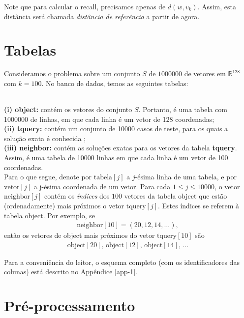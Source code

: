 \documentclass[a4paper,12pt,titlepage]{scrartcl}
\begin{document}
Note que para calcular o recall, precisamos apenas de $d(w,v_k)$. Assim, esta distância será chamada \emph{distância de referência} a partir de agora. 

\section{Tabelas}

Consideramos o problema sobre um conjunto $S$ de $1000000$ de vetores em $\mathbb{R}^{128}$ com $k = 100$. No banco de dados, temos as seguintes tabelas:\\\

\noindent\textbf{(i) object:} contém os vetores do conjunto $S$. Portanto, é uma tabela com 1000000 de linhas, em que cada linha é um vetor de 128 coordenadas;\\

\noindent\textbf{(ii) tquery:} contém um conjunto de 10000 casos de teste, para os quais a solução exata é conhecida ; \\

\noindent\textbf{(iii) neighbor:} contém as soluções exatas para os vetores da tabela \textbf{tquery}. Assim, é uma tabela de 10000 linhas em que cada linha é um vetor de 100 coordenadas.\\

Para o que segue, denote por $\mathrm{tabela}[j]$ a $j$-ésima linha de uma tabela, e por $\mathrm{vetor}[j]$ a j-ésima coordenada de um vetor. Para cada $1 \leq j \leq 10000$, o vetor $\mathrm{neighbor}[j]$ contém os \emph{índices} dos $100$ vetores da tabela object que estão (ordenadamente) mais próximos o vetor $\mathrm{tquery}[j]$. Estes índices se referem à tabela object. Por exemplo, se
\begin{align*} \mathrm{neighbor}[10] = (20,12,14,\ldots),
\end{align*}
então os vetores de object mais próximos do vetor $\mathrm{tquery}[10]$ são 
\begin{align*}\mathrm{object}[20], \,\mathrm{object}[12],\, \mathrm{object}[14],\, \ldots 
\end{align*}

Para a conveniência do leitor, o esquema completo (com os identificadores das colunas) está descrito no Appêndice \ref{app-1}. 

\section{Pré-processamento}
\end{document}
